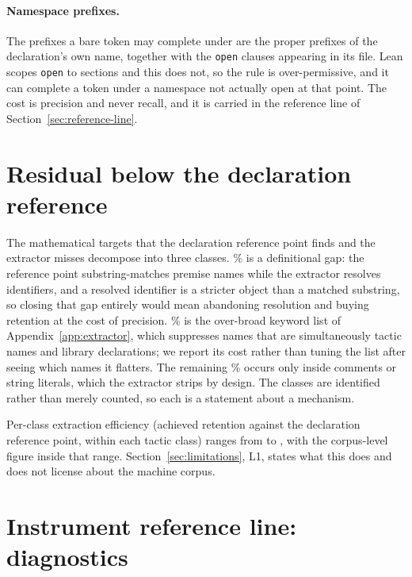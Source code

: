 \paragraph{Namespace prefixes.} The prefixes a bare token may complete under
are the proper prefixes of the declaration's own name, together with the
\texttt{open} clauses appearing in its file. Lean scopes \texttt{open} to
sections and this does not, so the rule is over-permissive, and it can
complete a token under a namespace not actually open at that point. The cost
is precision and never recall, and it is carried in the reference line of
Section~\ref{sec:reference-line}.

\section{Residual below the declaration reference}
\label{app:residual}

The \residualTargets{} mathematical targets that the declaration reference
point finds and the extractor misses decompose into three classes.
\residualResolutionPct{}\% is a definitional gap: the reference point
substring-matches premise names while the extractor resolves identifiers, and a
resolved identifier is a stricter object than a matched substring, so closing
that gap entirely would mean abandoning resolution and buying retention at the
cost of precision. \residualKeywordPct{}\% is the over-broad keyword list of
Appendix~\ref{app:extractor}, which suppresses names that are simultaneously
tactic names and library declarations; we report its cost rather than tuning
the list after seeing which names it flatters. The remaining
\residualCommentPct{}\% occurs only inside comments or string literals, which
the extractor strips by design. The classes are identified rather than merely
counted, so each is a statement about a mechanism.

Per-class extraction efficiency (achieved retention against the declaration
reference point, within each tactic class) ranges from
\efficiencyByClassMin{} to \efficiencyByClassMax{}, with the corpus-level
figure \efficiencyReachable{} inside that range. Section~\ref{sec:limitations},
L1, states what this does and does not license about the machine corpus.

\section{Instrument reference line: diagnostics}
\label{app:reference}

